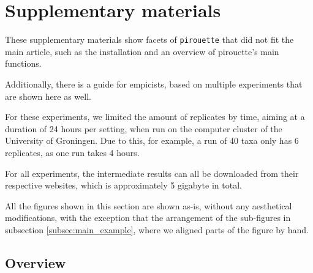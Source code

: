 \section{Supplementary materials}

These supplementary materials show facets of \verb;pirouette; that did not
fit the main article, such as the installation and an overview of
pirouette's main functions.

Additionally, there is a guide for empicists, based on multiple experiments
that are shown here as well.

For these experiments, we limited the amount of replicates by time, 
aiming at a duration of
24 hours per setting, when run on the computer cluster of the
University of Groningen. Due to this, for example, a run of 40 taxa only
has 6 replicates, as one run takes 4 hours.

For all experiments, the intermediate results can all be downloaded 
from their respective websites, which is approximately 5 gigabyte in total.

All the figures shown in this section are shown as-is, 
without any aesthetical modifications, with the exception that the arrangement
of the sub-figures in subsection \ref{subsec:main_example},
where we aligned parts of the figure by hand.

\subsection{Overview}

